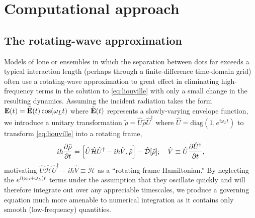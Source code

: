 \section{Computational approach}

\subsection{\label{sec:rwa}The rotating-wave approximation}

Models of lone \qds{} or \qd{} ensembles in which the separation between dots far exceeds a typical interaction length (perhaps through a finite-difference time-domain grid) often use a rotating-wave approximation to great effect in eliminating high-frequency terms in the solution to \cref{eq:liouville} with only a small change in the resulting dynamics.
Assuming the incident radiation takes the form $\vb{E}(t) = \tilde{\vb{E}}(t) \cos(\omega_L t)$
where $\tilde{\vb{E}}(t)$ represents a slowly-varying envelope function, we introduce a unitary transformation $\tilde{\rho} = \hat{U} \hat{\rho} \hat{U}^\dagger$ where $\hat{U} = \mathrm{diag}(1, e^{i \omega_L t})$ to transform \cref{eq:liouville} into a rotating frame,
\begin{equation}
  i \hbar \pdv{\tilde{\rho}}{t} = \commutator{\hat{U} \hat{\mathcal{H}} \hat{U}^\dagger - i \hbar \hat{V}}{\tilde{\rho}} - \hat{\mathcal{D}}\qty[\tilde{\rho}]; \quad \hat{V} \equiv \hat{U} \pdv{\hat{U}^\dagger}{t},
  \label{eq:rotating liouville}
\end{equation}
motivating $\hat{U} \hat{\mathcal{H}} \hat{U}^\dagger - i \hbar \hat{V} \equiv \tilde{\mathcal{H}}$ as a ``rotating-frame Hamiltonian.''
By neglecting the $e^{i \qty(\omega_0 + \omega_L) t}$ terms under the assumption that they oscillate quickly and will therefore integrate out over any appreciable timescales, we produce a governing equation much more amenable to numerical integration as it contains only smooth (low-frequency) quantities.

